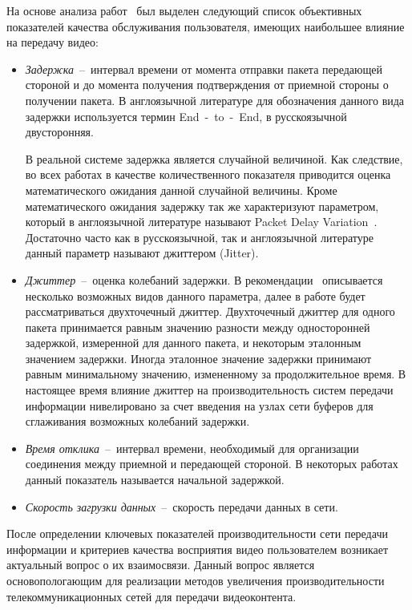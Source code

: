 На основе анализа работ~\cite{Chen,Cacheda2007,HuaweiReport} был выделен следующий список объективных показателей качества обслуживания пользователя, имеющих наибольшее влияние на передачу видео:
\begin{itemize}
  \item \textit{Задержка}~--~интервал времени от момента отправки пакета передающей стороной и до момента получения подтверждения от приемной стороны о получении пакета. В англоязычной литературе для обозначения данного вида задержки используется термин End~-~to~-~End, в русскоязычной двусторонняя.

  В реальной системе задержка является случайной величиной. Как следствие, во всех работах в качестве количественного показателя приводится оценка математического ожидания данной случайной величины. Кроме математического ожидания задержку так же характеризуют параметром, который в англоязычной литературе называют Packet Delay Variation~\cite{Jitter}. Достаточно часто как в русскоязычной, так и англоязычной литературе данный параметр называют джиттером (Jitter).
  \item \textit{Джиттер}~--~оценка колебаний задержки. В рекомендации~\cite{Jitter} описывается несколько возможных видов данного параметра, далее в работе будет рассматриваться двухточечный джиттер. Двухточечный джиттер для одного пакета принимается равным значению разности между односторонней задержкой, измеренной для данного пакета, и некоторым эталонным значением задержки. Иногда эталонное значение задержки принимают равным минимальному значению, измененному за продолжительное время. В настоящее время влияние джиттер на производительность систем передачи информации нивелировано за счет введения на узлах сети буферов для сглаживания возможных колебаний задержки.
  \item \textit{Время отклика}~--~интервал времени, необходимый для организации соединения между приемной и передающей стороной. В некоторых работах данный показатель называется начальной задержкой.
  \item \textit{Скорость загрузки данных}~--~скорость передачи данных в сети.
\end{itemize}

После определении ключевых показателей производительности сети передачи информации и критериев качества восприятия видео пользователем возникает актуальный вопрос о их взаимосвязи. Данный вопрос является основопологающим для реализации методов увеличения производительности телекоммуникационных сетей для передачи видеоконтента.

